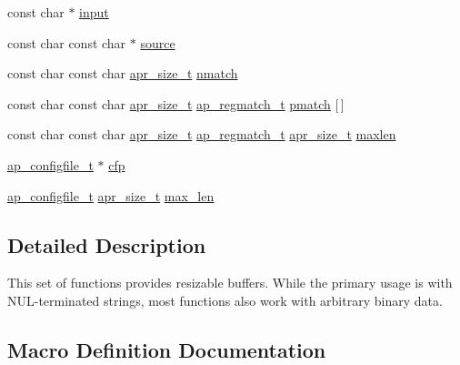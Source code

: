 \begin{DoxyCompactItemize}
\item 
const char $\ast$ \hyperlink{group__APACHE__CORE__VARBUF_ga9adc11d527cdd7b029b0d2ccd910ff3b}{input}
\item 
const char const char $\ast$ \hyperlink{group__APACHE__CORE__VARBUF_ga8785b64d8b2e8a8dabdc67bcb5924cad}{source}
\item 
const char const char \hyperlink{group__apr__platform_gaaa72b2253f6f3032cefea5712a27540e}{apr\+\_\+size\+\_\+t} \hyperlink{group__APACHE__CORE__VARBUF_ga9d58fcf3696c5595d3b00c07c7842db1}{nmatch}
\item 
const char const char \hyperlink{group__apr__platform_gaaa72b2253f6f3032cefea5712a27540e}{apr\+\_\+size\+\_\+t} \hyperlink{structap__regmatch__t}{ap\+\_\+regmatch\+\_\+t} \hyperlink{group__APACHE__CORE__VARBUF_ga7c05b6acd725631a6809522d7d5545cc}{pmatch} \mbox{[}$\,$\mbox{]}
\item 
const char const char \hyperlink{group__apr__platform_gaaa72b2253f6f3032cefea5712a27540e}{apr\+\_\+size\+\_\+t} \hyperlink{structap__regmatch__t}{ap\+\_\+regmatch\+\_\+t} \hyperlink{group__apr__platform_gaaa72b2253f6f3032cefea5712a27540e}{apr\+\_\+size\+\_\+t} \hyperlink{group__APACHE__CORE__VARBUF_gacf9683dcc597aebf09865b0853b88438}{maxlen}
\item 
\hyperlink{structap__configfile__t}{ap\+\_\+configfile\+\_\+t} $\ast$ \hyperlink{group__APACHE__CORE__VARBUF_gafd1e985ac7e063846f7e379904968e67}{cfp}
\item 
\hyperlink{structap__configfile__t}{ap\+\_\+configfile\+\_\+t} \hyperlink{group__apr__platform_gaaa72b2253f6f3032cefea5712a27540e}{apr\+\_\+size\+\_\+t} \hyperlink{group__APACHE__CORE__VARBUF_gad3a730ac0298f721d38d4c28c146d84e}{max\+\_\+len}
\end{DoxyCompactItemize}


\subsection{Detailed Description}
This set of functions provides resizable buffers. While the primary usage is with N\+U\+L-\/terminated strings, most functions also work with arbitrary binary data. 

\subsection{Macro Definition Documentation}
